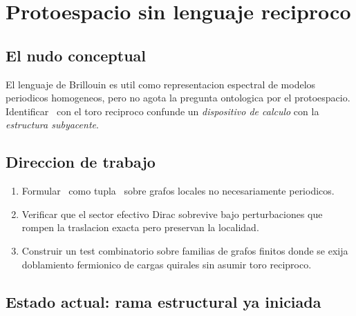 \chapter{Protoespacio sin lenguaje reciproco}
\label{ch:proto-sin-brillouin}


\section{El nudo conceptual}

El lenguaje de Brillouin es util como representacion espectral de modelos
periodicos homogeneos, pero no agota la pregunta ontologica por el
protoespacio. Identificar \Proto\ con el toro reciproco confunde un
\emph{dispositivo de calculo} con la \emph{estructura subyacente}.

\section{Direccion de trabajo}

\begin{enumerate}[label=(E\arabic*),leftmargin=*]
  \item Formular \Proto\ como tupla \ProtoTuple\ sobre grafos locales no
        necesariamente periodicos.
  \item Verificar que el sector efectivo Dirac sobrevive bajo
        perturbaciones que rompen la traslacion exacta pero preservan la
        localidad.
  \item Construir un test combinatorio sobre familias de grafos finitos
        donde se exija doblamiento fermionico de cargas quirales sin asumir
        toro reciproco.
\end{enumerate}

\section{Estado actual: rama estructural ya iniciada}

